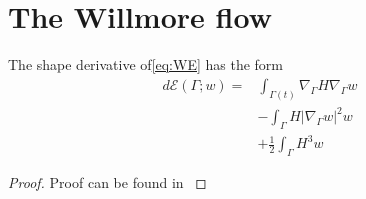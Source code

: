 

\newpage
\section{The Willmore flow}%
\label{sec:evolutionary_pde_s_of_the_willmore_flow}



\begin{lemma}
The shape derivative of\eqref{eq:WE} has the form
\[
    \begin{split}
        d\mathcal{E} \left( \Gamma; w  \right)  =& \int_{\Gamma \left( t \right) }^{}  \nabla_{\Gamma } H  \nabla _{\Gamma } w    \\
    & - \int_{\Gamma }^{} H  |\nabla _{\Gamma }  w |^{2} w   \\
    &  + \frac{1}{2} \int_{\Gamma }^{} H^{3} w
    \end{split}
\]

\end{lemma}

\begin{proof}
    Proof can be found in \cite{willmore1996riemannian}
\end{proof}





